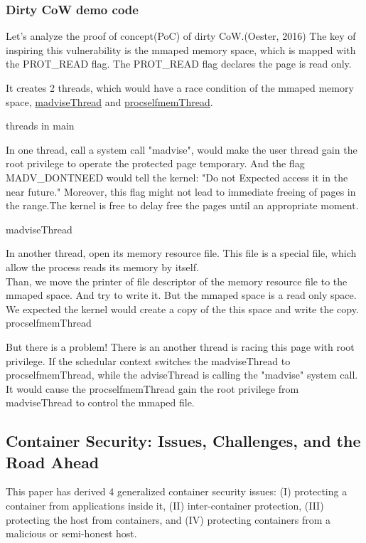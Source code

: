 \documentclass[12pt,a4paper,oneside]{IEEEconf}
\begin{document}
\subsubsection{Dirty CoW demo code}
Let's analyze the proof of concept(PoC) of dirty CoW.(Oester, 2016)\cite{Dirty_CoW}
The key of inspiring this vulnerability is the mmaped memory space, which is mapped with
the PROT\_READ flag. The PROT\_READ flag declares the page is read only.


It creates 2 threads, which would have a race condition of the mmaped memory space,
\hyperlink{madvise}{madviseThread} and \hyperlink{procself}{procselfmemThread}.

\hypertarget{threads_main}{threads in main}


In one thread, call a system call "madvise", would make the user thread gain the root
privilege to operate the protected page temporary. And the flag MADV\_DONTNEED would
tell the kernel: "Do not Expected access it in the near future.\cite{Madvise}" Moreover,
this flag might not lead to immediate freeing of pages in the range.The kernel is free
to delay free the pages until an appropriate moment.\cite{Madvise}

\hypertarget{madvise}{madviseThread}


In another thread, open its memory resource file. This file is a special file, which allow
the process reads its memory by itself.\\
Than, we move the printer of file descriptor of the memory resource file to the mmaped
space. And try to write it. But the mmaped space is a read only space. We expected the
kernel would create a copy of the this space and write the copy\cite{root_exploit}.
\hypertarget{procself}{procselfmemThread}


But there is a problem! There is an another thread is racing this page with root privilege.
If the schedular context switches the madviseThread to procselfmemThread, while the
adviseThread is calling the "madvise" system call. It would cause the procselfmemThread
gain the root privilege from madviseThread to control the mmaped file.

\subsection{Container Security: Issues, Challenges, and the Road Ahead}
This paper\cite{Road_Ahead} has derived 4 generalized container security issues:
(\RN{1}) protecting a container from applications inside it, (\RN{2}) inter-container
protection, (\RN{3}) protecting the host from containers, and (\RN{4}) protecting containers
from a malicious or semi-honest host.\cite{Road_Ahead}
\end{document}
